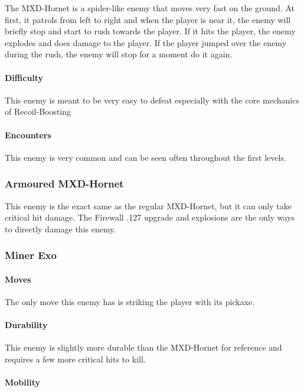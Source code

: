 \documentclass[12pt]{article}
\begin{document}
The MXD-Hornet is a spider-like enemy that moves very fast on the ground. At first, it patrols from left to right and when the player is near it, the enemy will briefly stop and start to rush towards the player. If it hits the player, the enemy explodes and does damage to the player. If the player jumped over the enemy during the rush, the enemy will stop for a moment do it again. 

\paragraph{Difficulty}

This enemy is meant to be very easy to defeat especially with the core mechanics of Recoil-Boosting

\paragraph{Encounters}

This enemy is very common and can be seen often throughout the first levels.

\subsubsection{Armoured MXD-Hornet}

This enemy is the exact same as the regular MXD-Hornet, but it can only take critical hit damage. The Firewall .127 upgrade and explosions are the only ways to directly damage this enemy. 

\subsubsection{Miner Exo}

\paragraph{Moves}

The only move this enemy has is striking the player with its pickaxe.

\paragraph{Durability}

This enemy is slightly more durable than the MXD-Hornet for reference and requires a few more critical hits to kill. 

\paragraph{Mobility}
\end{document}
